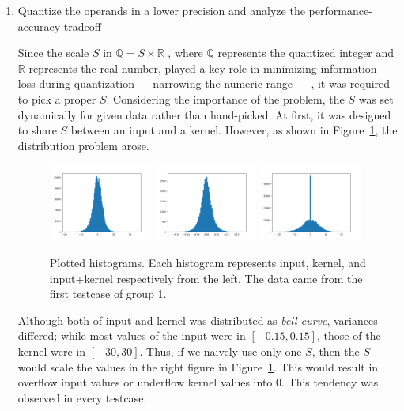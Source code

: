\documentclass[a4paper,12pt]{article}
\begin{document}
\begin{enumerate}
		\item Quantize the operands in a lower precision and analyze the performance-accuracy tradeoff
			\begin{answer}
				Since the scale $S$ in 
					$\mathbb{Q} = S \times \mathbb{R}$
				, where $\mathbb{Q}$ represents the quantized integer and $\mathbb{R}$ represents the real number, played a key-role in minimizing information loss during quantization --- narrowing the numeric range --- , it was required to pick a proper $S$. 
				Considering the importance of the problem, the $S$ was set dynamically for given data rather than hand-picked.
				At first, it was designed to share $S$ between an input and a kernel.
				However, as shown in Figure~\ref{fig:histogram}, the distribution problem arose.
				\begin{figure}[htbp]
					\centering
					\includegraphics[width=0.32\textwidth]{1_input}
					\includegraphics[width=0.32\textwidth]{1_kernel}
					\includegraphics[width=0.32\textwidth]{1_combine}
					\caption{Plotted histograms. Each histogram represents input, kernel, and input+kernel respectively from the left. The data came from the first testcase of group 1.}%
					\label{fig:histogram}
				\end{figure}

				Although both of input and kernel was distributed as \emph{bell-curve}, variances differed; 
				while most values of the input were in $[-0.15,0.15]$, those of the kernel were in $[-30, 30]$.
				Thus, if we naively use only one $S$, then the $S$ would scale the values in the right figure in Figure~\ref{fig:histogram}.
				This would result in overflow input values or underflow kernel values into 0.
				This tendency was observed in every testcase.


\end{answer}
\end{enumerate}
\end{document}
